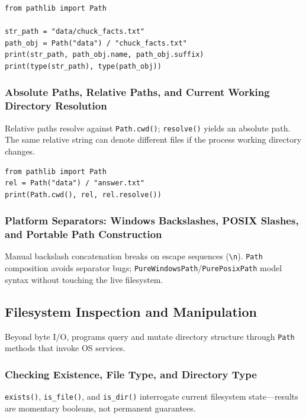 \documentclass[a4paper,twoside]{report}
\begin{document}
\begin{verbatim}
from pathlib import Path

str_path = "data/chuck_facts.txt"
path_obj = Path("data") / "chuck_facts.txt"
print(str_path, path_obj.name, path_obj.suffix)
print(type(str_path), type(path_obj))
\end{verbatim}

\subsubsection{Absolute Paths, Relative Paths, and Current Working Directory Resolution}

Relative paths resolve against \texttt{Path.cwd()}; \texttt{resolve()} yields an absolute path. The same relative string can denote different files if the process working directory changes.

\begin{verbatim}
from pathlib import Path
rel = Path("data") / "answer.txt"
print(Path.cwd(), rel, rel.resolve())
\end{verbatim}

\subsubsection{Platform Separators: Windows Backslashes, POSIX Slashes, and Portable Path Construction}

Manual backslash concatenation breaks on escape sequences (\texttt{\textbackslash n}). \texttt{Path} composition avoids separator bugs; \texttt{PureWindowsPath}/\texttt{PurePosixPath} model syntax without touching the live filesystem.


\subsection{Filesystem Inspection and Manipulation}

Beyond byte I/O, programs query and mutate directory structure through \texttt{Path} methods that invoke OS services.

\subsubsection{Checking Existence, File Type, and Directory Type}

\texttt{exists()}, \texttt{is\_file()}, and \texttt{is\_dir()} interrogate current filesystem state---results are momentary booleans, not permanent guarantees.
\end{document}
